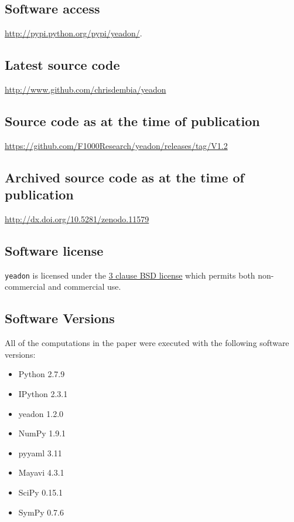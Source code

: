 \documentclass[10pt,a4paper,twocolumn]{article}
\begin{document}
\subsection*{Software access}
\url{http://pypi.python.org/pypi/yeadon/}.

\subsection*{Latest source code}
\url{http://www.github.com/chrisdembia/yeadon}

\subsection*{Source code as at the time of publication}
\url{https://github.com/F1000Research/yeadon/releases/tag/V1.2}

\subsection*{Archived source code as at the time of publication}
\url{http://dx.doi.org/10.5281/zenodo.11579} \cite{Christopher:11579}

\subsection*{Software license}
\verb+yeadon+ is licensed under the
\href{http://opensource.org/licenses/BSD-3-Clause}{3 clause BSD license} which
permits both non-commercial and commercial use.

\subsection*{Software Versions}
All of the computations in the paper were executed with the following software
versions:
\begin{itemize}
  \item Python 2.7.9
  \item IPython 2.3.1
  \item yeadon 1.2.0
  \item NumPy 1.9.1
  \item pyyaml 3.11
  \item Mayavi 4.3.1
  \item SciPy 0.15.1
  \item SymPy 0.7.6
\end{itemize}
\end{document}
